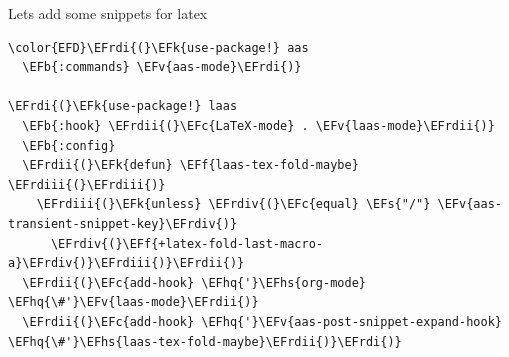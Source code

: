 \documentclass{scrartcl}
\newcommand{\EFk}[1]{\textcolor{EFk}{#1}} %
\newcommand{\EFs}[1]{\textcolor{EFs}{#1}} %
\newcommand{\EFb}[1]{\textcolor{EFb}{#1}} %
\newcommand{\EFc}[1]{\textcolor{EFc}{#1}} %
\newcommand{\EFv}[1]{\textcolor{EFv}{#1}} %
\newcommand{\EFf}[1]{\textcolor{EFf}{#1}} %
\newcommand{\EFhq}[1]{#1} %
\newcommand{\EFhs}[1]{#1} %
\newcommand{\EFrdi}[1]{#1} %
\newcommand{\EFrdii}[1]{#1} %
\newcommand{\EFrdiii}[1]{#1} %
\newcommand{\EFrdiv}[1]{#1} %
\begin{document}
Lets add some snippets for latex
\begin{Code}
\begin{Verbatim}[]
\color{EFD}\EFrdi{(}\EFk{use-package!} aas
  \EFb{:commands} \EFv{aas-mode}\EFrdi{)}

\EFrdi{(}\EFk{use-package!} laas
  \EFb{:hook} \EFrdii{(}\EFc{LaTeX-mode} . \EFv{laas-mode}\EFrdii{)}
  \EFb{:config}
  \EFrdii{(}\EFk{defun} \EFf{laas-tex-fold-maybe} \EFrdiii{(}\EFrdiii{)}
    \EFrdiii{(}\EFk{unless} \EFrdiv{(}\EFc{equal} \EFs{"/"} \EFv{aas-transient-snippet-key}\EFrdiv{)}
      \EFrdiv{(}\EFf{+latex-fold-last-macro-a}\EFrdiv{)}\EFrdiii{)}\EFrdii{)}
  \EFrdii{(}\EFc{add-hook} \EFhq{'}\EFhs{org-mode} \EFhq{\#'}\EFv{laas-mode}\EFrdii{)}
  \EFrdii{(}\EFc{add-hook} \EFhq{'}\EFv{aas-post-snippet-expand-hook} \EFhq{\#'}\EFhs{laas-tex-fold-maybe}\EFrdii{)}\EFrdi{)}

\end{Verbatim}
\end{Code}
\end{document}
